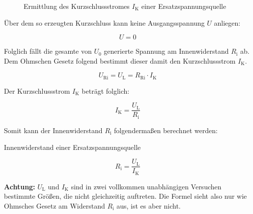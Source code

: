 \begin{frame}
{\begin{figure}[h!]
\begin{center}
\end{center}
	\caption{Ermittlung des Kurzschlussstromes $I_\mathrm{K}$ einer Ersatzspannungsquelle}
	\label{fig:kurzschluss1}
	

\end{figure}

Über dem so erzeugten Kurzschluss kann keine Ausgangsspannung $U$ anliegen:

\begin{equation*}
	U = 0
\end{equation*}

Folglich fällt die gesamte von $U_0$ generierte Spannung am Innenwiderstand $R_\mathrm{i}$ ab.
Dem Ohmschen Gesetz folgend bestimmt dieser damit den Kurzschlussstrom $I_\mathrm{K}$. 

\begin{equation*}
	U_\mathrm{Ri} = U_\mathrm{L} =R_\mathrm{Ri} \cdot I_\mathrm{K}
\end{equation*}

Der Kurzschlussstrom $I_\mathrm{K}$ beträgt folglich:


	

\begin{equation*}
	I_\mathrm{K} = \frac{U_\mathrm{L}}{R_\mathrm{i}}
\end{equation*}

Somit kann der Innenwiderstand $R_\mathrm{i}$ folgendermaßen berechnet werden:

\begin{Merksatz}{Innenwiderstand einer Ersatzspannungsquelle}{}

	\begin{equation*}
		R_\mathrm{i} = \frac{U_\mathrm{L}}{I_\mathrm{K}}
	\end{equation*}
	
\end{Merksatz}

\textbf{Achtung:} $U_\mathrm{L}$ und $I_\mathrm{K}$ sind in zwei vollkommen unabhängigen Versuchen bestimmte Größen, 
die nicht gleichzeitig auftreten. Die Formel sieht also nur wie Ohmsches Gesetz am Widerstand $R_\mathrm{i}$ aus,
ist es aber nicht. 











}
\end{frame}
